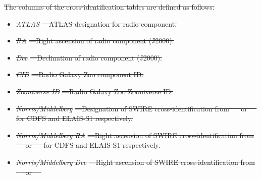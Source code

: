 \documentclass[11pt, a4paper]{book}
\providecommand{\DIFdeltex}[1]{{\protect\color{red}\sout{#1}}}                      %
\providecommand{\DIFdel}[1]{\texorpdfstring{\DIFdeltex{#1}}{}} %
\begin{document}
\DIFdel{The columns of the cross-identification tables are defined as follows:
  }%
\begin{itemize}%
\item%
\emph{\DIFdel{ATLAS}}%
\DIFdel{---ATLAS designation for radio component.
    }%
\item%
\emph{\DIFdel{RA}}%
\DIFdel{---Right ascension of radio component (J2000).
    }%
\item%
\emph{\DIFdel{Dec}}%
\DIFdel{---Declination of radio component (J2000).
    }%
\item%
\emph{\DIFdel{CID}}%
\DIFdel{---Radio Galaxy Zoo component ID.
    }%
\item%
\emph{\DIFdel{Zooniverse ID}}%
\DIFdel{---Radio Galaxy Zoo Zooniverse ID.
    }%
\item%
\emph{\DIFdel{Norris/Middelberg}}%
\DIFdel{---Designation of SWIRE cross-identification from \mbox{%
\citet{norris06} }\hspace{0pt}%
or \mbox{%
\citet{middelberg08} }\hspace{0pt}%
for CDFS and ELAIS-S1 respectively.
    }%
\item%
\emph{\DIFdel{Norris/Middelberg RA}}%
\DIFdel{---Right ascension of SWIRE cross-identification from \mbox{%
\citet{norris06} }\hspace{0pt}%
or \mbox{%
\citet{middelberg08} }\hspace{0pt}%
for CDFS and ELAIS-S1 respectively.
    }%
\item%
\emph{\DIFdel{Norris/Middelberg Dec}}%
\DIFdel{---Right ascension of SWIRE cross-identification from \mbox{%
\citet{norris06} }\hspace{0pt}%
or \mbox{%
\citet{middelberg08} }\hspace{0pt}%
}
\end{itemize}
\end{document}
